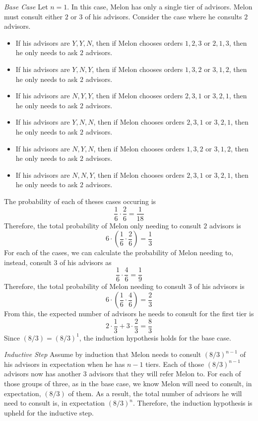 \documentclass[12pt,twoside]{article}
\begin{document}
\begin{problems}
\begin{problemparts}
{\it Base Case} Let $n = 1$. In this case, Melon has only a single tier of
advisors. Melon must consult either $2$ or $3$ of his advisors. Consider the
case where he consults $2$ advisors.

\begin{itemize}
  \item If his advisors are $Y, Y, N$, then if Melon chooses orders $1, 2,
  3$ or $2, 1, 3$, then he only needs to ask $2$ advisors.
  \item If his advisors are $Y, N, Y$, then if Melon chooses orders $1, 3, 2$
  or $3, 1, 2$, then he only needs to ask $2$ advisors.
  \item If his advisors are $N, Y, Y$, then if Melon chooses orders $2, 3, 1$
  or $3, 2, 1$, then he only needs to ask $2$ advisors.
  \item If his advisors are $Y, N, N$, then if Melon chooses orders $2, 3, 1$
  or $3, 2, 1$, then he only needs to ask $2$ advisors.
  \item If his advisors are $N, Y, N$, then if Melon chooses orders $1, 3, 2$
  or $3, 1, 2$, then he only needs to ask $2$ advisors.
  \item If his advisors are $N, N, Y$, then if Melon chooses orders $2, 3, 1$
  or $3, 2, 1$, then he only needs to ask $2$ advisors.
\end{itemize}

The probability of each of theses cases occuring is
$$ \frac{1}{6} \cdot \frac{2}{6} = \frac{1}{18} $$
Therefore, the total probability of Melon only needing to consult $2$
advisors is
$$ 6 \cdot \left(\frac{1}{6} \cdot \frac{2}{6}\right) = \frac{1}{3} $$
For each of the cases, we can calculate the probability of Melon needing to,
instead, consult $3$ of his advisors as
$$ \frac{1}{6} \cdot \frac{4}{6} = \frac{1}{9} $$
Therefore, the total probability of Melon needing to consult $3$ of his
advisors is
$$ 6 \cdot \left(\frac{1}{6} \cdot \frac{4}{6}\right) = \frac{2}{3} $$
From this, the expected number of advisors he needs to consult for the first
tier is
$$ 2 \cdot \frac{1}{3} + 3 \cdot \frac{2}{3} = \frac{8}{3} $$
Since $\left(8 / 3\right) = \left(8 / 3\right)^1$, the induction hypothesis
holds for the base case.

{\it Inductive Step} Assume by induction that Melon needs to consult $\left(8
/ 3\right)^{n - 1}$ of his advisors in expectation when he has $n - 1$ tiers.
Each of those $\left(8 / 3\right)^{n - 1}$ advisors now has another $3$
advisors that they will refer Melon to. For each of those groups of three, as
in the base case, we know Melon will need to consult, in expectation,
$\left(8 / 3\right)$ of them. As a result, the total number of advisors he
will need to consult is, in expectation $\left(8 / 3\right)^n$. Therefore,
the induction hypothesis is upheld for the inductive step.


\end{problemparts}
\end{problems}
\end{document}
